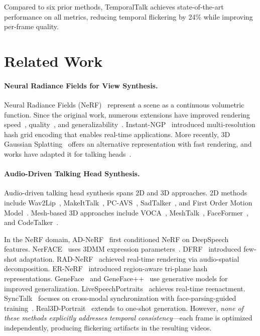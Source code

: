 \documentclass[10pt,twocolumn,letterpaper]{article}
\begin{document}
Compared to six prior methods, TemporalTalk achieves state-of-the-art performance on all metrics, reducing temporal flickering by 24\% while improving per-frame quality.

\section{Related Work}
\label{sec:related_work}

\paragraph{Neural Radiance Fields for View Synthesis.}
Neural Radiance Fields (NeRF)~\cite{mildenhall2020nerf} represent a scene as a continuous volumetric function.
Since the original work, numerous extensions have improved rendering speed~\cite{mueller2022instant,fridovich2022plenoxels,chen2022tensorf}, quality~\cite{barron2021mipnerf,barron2022mipnerf360}, and generalizability~\cite{yu2021pixelnerf,wang2021ibrnet}.
Instant-NGP~\cite{mueller2022instant} introduced multi-resolution hash grid encoding that enables real-time applications.
More recently, 3D Gaussian Splatting~\cite{kerbl20233dgs} offers an alternative representation with fast rendering, and works have adapted it for talking heads~\cite{yu2024gaussiantalker,li2024talkinggaussian}.

\paragraph{Audio-Driven Talking Head Synthesis.}
Audio-driven talking head synthesis spans 2D and 3D approaches.
2D methods include Wav2Lip~\cite{prajwal2020wav2lip}, MakeItTalk~\cite{zhou2020makelttalk}, PC-AVS~\cite{zhou2021pcavs}, SadTalker~\cite{zhang2023sadtalker}, and First Order Motion Model~\cite{siarohin2019fomm}.
Mesh-based 3D approaches include VOCA~\cite{cudeiro2019voca}, MeshTalk~\cite{richard2021meshtalk}, FaceFormer~\cite{fan2022faceformer}, and CodeTalker~\cite{xing2023codetalker}.

In the NeRF domain, AD-NeRF~\cite{guo2021adnerf} first conditioned NeRF on DeepSpeech~\cite{hannun2014deepspeech} features.
NerFACE~\cite{gafni2021nerface} uses 3DMM expression parameters~\cite{blanz1999morphable}.
DFRF~\cite{shen2022dfrf} introduced few-shot adaptation.
RAD-NeRF~\cite{tang2022radnerf} achieved real-time rendering via audio-spatial decomposition.
ER-NeRF~\cite{li2023ernerf} introduced region-aware tri-plane hash representations.
GeneFace~\cite{ye2023geneface} and GeneFace++~\cite{ye2023genefacepp} use generative models for improved generalization.
LiveSpeechPortraits~\cite{lu2021lsp} achieves real-time reenactment.
SyncTalk~\cite{peng2024synctalk} focuses on cross-modal synchronization with face-parsing-guided training~\cite{yu2018bisenet}.
Real3D-Portrait~\cite{ye2024real3dportrait} extends to one-shot generation.
However, \emph{none of these methods explicitly addresses temporal consistency}---each frame is optimized independently, producing flickering artifacts in the resulting videos.
\end{document}
